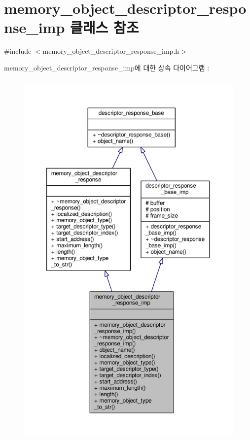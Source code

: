 \hypertarget{classavdecc__lib_1_1memory__object__descriptor__response__imp}{}\section{memory\+\_\+object\+\_\+descriptor\+\_\+response\+\_\+imp 클래스 참조}
\label{classavdecc__lib_1_1memory__object__descriptor__response__imp}


{\ttfamily \#include $<$memory\+\_\+object\+\_\+descriptor\+\_\+response\+\_\+imp.\+h$>$}



memory\+\_\+object\+\_\+descriptor\+\_\+response\+\_\+imp에 대한 상속 다이어그램 \+: 
\nopagebreak
\begin{figure}[H]
\begin{center}
\leavevmode
\includegraphics[height=550pt]{classavdecc__lib_1_1memory__object__descriptor__response__imp__inherit__graph}
\end{center}
\end{figure}


